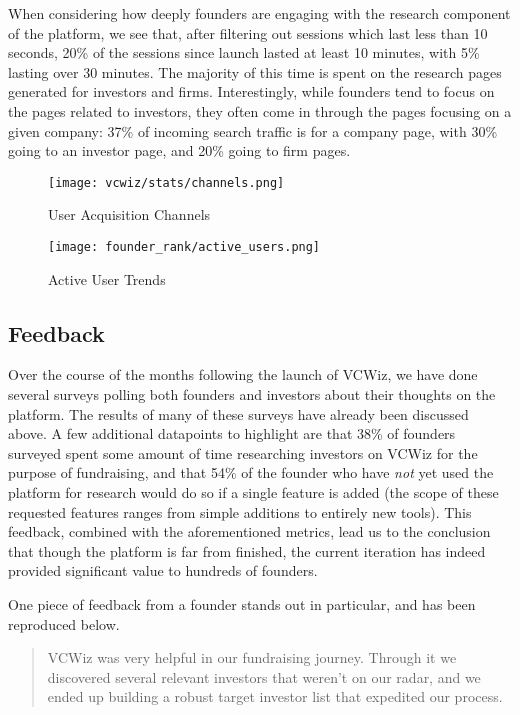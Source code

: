 When considering how deeply founders are engaging with the research component of the platform, we see that, after filtering out sessions which last less than 10 seconds, 20\% of the sessions since launch lasted at least 10 minutes, with 5\% lasting over 30 minutes. The majority of this time is spent on the research pages generated for investors and firms. Interestingly, while founders tend to focus on the pages related to investors, they often come in through the pages focusing on a given company: 37\% of incoming search traffic is for a company page, with 30\% going to an investor page, and 20\% going to firm pages.

\begin{figure}[ht]
  \centering
  \begin{minipage}[t]{0.5\textwidth}
    \centering
    \texttt{[image: vcwiz/stats/channels.png]}
    \caption{User Acquisition Channels}
    \label{fig:acquisition}
  \end{minipage}\hfill
  \begin{minipage}[t]{0.5\textwidth}
    \centering
    \texttt{[image: founder\_rank/active\_users.png]}
    \caption{Active User Trends}
    \label{fig:actives}
  \end{minipage}
\end{figure}

\subsection{Feedback}

Over the course of the months following the launch of VCWiz, we have done several surveys polling both founders and investors about their thoughts on the platform. The results of many of these surveys have already been discussed above. A few additional datapoints to highlight are that 38\% of founders surveyed spent some amount of time researching investors on VCWiz for the purpose of fundraising, and that 54\% of the founder who have \textit{not} yet used the platform for research would do so if a single feature is added (the scope of these requested features ranges from simple additions to entirely new tools). This feedback, combined with the aforementioned metrics, lead us to the conclusion that though the platform is far from finished, the current iteration has indeed provided significant value to hundreds of founders.

One piece of feedback from a founder stands out in particular, and has been reproduced below.

\begin{quote}
VCWiz was very helpful in our fundraising journey. Through it we discovered several relevant investors that weren't on our radar, and we ended up building a robust target investor list that expedited our process.
\end{quote}

